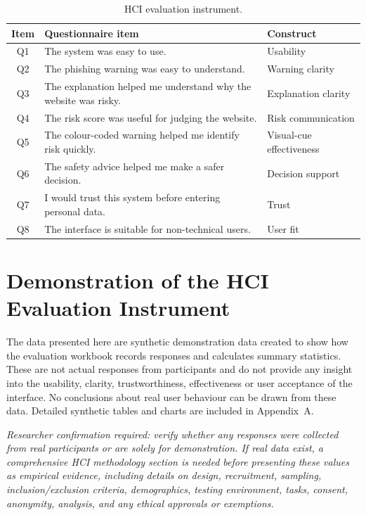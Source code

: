 \documentclass[11pt,a4paper]{article}
\begin{document}
\begin{table}[H]
\caption{HCI evaluation instrument.}
\label{tab:hci-instrument}
\centering\footnotesize
\begin{tabularx}{\textwidth}{c L p{3.6cm}}
\toprule
\textbf{Item} & \textbf{Questionnaire item} & \textbf{Construct} \\
\midrule
Q1 & The system was easy to use. & Usability \\
Q2 & The phishing warning was easy to understand. & Warning clarity \\
Q3 & The explanation helped me understand why the website was risky. & Explanation clarity \\
Q4 & The risk score was useful for judging the website. & Risk communication \\
Q5 & The colour-coded warning helped me identify risk quickly. & Visual-cue effectiveness \\
Q6 & The safety advice helped me make a safer decision. & Decision support \\
Q7 & I would trust this system before entering personal data. & Trust \\
Q8 & The interface is suitable for non-technical users. & User fit \\
\bottomrule
\end{tabularx}
\end{table}

\section{Demonstration of the HCI Evaluation Instrument}

The data presented here are synthetic demonstration data created to show how the evaluation
workbook records responses and calculates summary statistics. These are not actual responses
from participants and do not provide any insight into the usability, clarity, trustworthiness,
effectiveness or user acceptance of the interface. No conclusions about real user behaviour can
be drawn from these data. Detailed synthetic tables and charts are included in Appendix~A.

\textit{Researcher confirmation required: verify whether any responses were collected from real
participants or are solely for demonstration. If real data exist, a comprehensive HCI
methodology section is needed before presenting these values as empirical evidence, including
details on design, recruitment, sampling, inclusion/exclusion criteria, demographics, testing
environment, tasks, consent, anonymity, analysis, and any ethical approvals or exemptions.}
\end{document}
